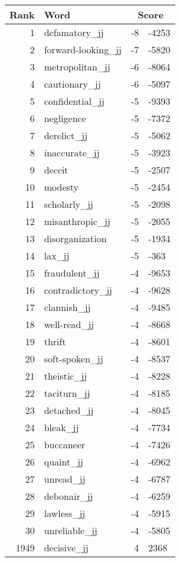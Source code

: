 \begin{longtable}[!htbp]{| rlr@{.}l |}
    \hline
    \textbf{Rank} & \textbf{Word} & \multicolumn{2}{c|}{\textbf{Score}} \\
    \hline
    \endhead
    1 & defamatory\_jj & -8 & -4253 \\
    2 & forward-looking\_jj & -7 & -5820 \\
    3 & metropolitan\_jj & -6 & -8064 \\
    4 & cautionary\_jj & -6 & -5097 \\
    5 & confidential\_jj & -5 & -9393 \\
    6 & negligence & -5 & -7372 \\
    7 & derelict\_jj & -5 & -5062 \\
    8 & inaccurate\_jj & -5 & -3923 \\
    9 & deceit & -5 & -2507 \\
    10 & modesty & -5 & -2454 \\
    11 & scholarly\_jj & -5 & -2098 \\
    12 & misanthropic\_jj & -5 & -2055 \\
    13 & disorganization & -5 & -1934 \\
    14 & lax\_jj & -5 & -363 \\
    15 & fraudulent\_jj & -4 & -9653 \\
    16 & contradictory\_jj & -4 & -9628 \\
    17 & clannish\_jj & -4 & -9485 \\
    18 & well-read\_jj & -4 & -8668 \\
    19 & thrift & -4 & -8601 \\
    20 & soft-spoken\_jj & -4 & -8537 \\
    21 & theistic\_jj & -4 & -8228 \\
    22 & taciturn\_jj & -4 & -8185 \\
    23 & detached\_jj & -4 & -8045 \\
    24 & bleak\_jj & -4 & -7734 \\
    25 & buccaneer & -4 & -7426 \\
    26 & quaint\_jj & -4 & -6962 \\
    27 & unread\_jj & -4 & -6787 \\
    28 & debonair\_jj & -4 & -6259 \\
    29 & lawless\_jj & -4 & -5915 \\
    30 & unreliable\_jj & -4 & -5805 \\
    1949 & decisive\_jj & 4 & 2368 \\

\end{longtable}
